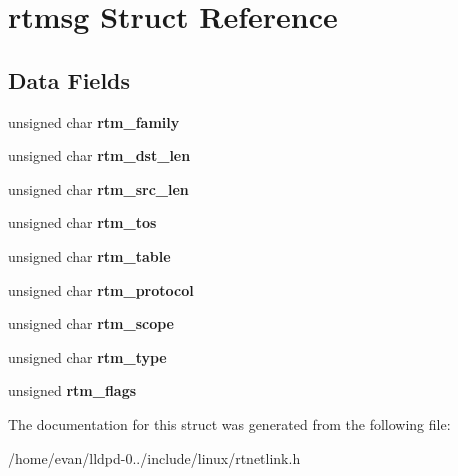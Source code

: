 \section{rtmsg \-Struct \-Reference}
\label{structrtmsg}
\subsection*{\-Data \-Fields}
\begin{DoxyCompactItemize}
\item 
unsigned char {\bfseries rtm\-\_\-family}\label{structrtmsg_ad11d15ca85801239d8d99ba1a2646729}

\item 
unsigned char {\bfseries rtm\-\_\-dst\-\_\-len}\label{structrtmsg_a1e83c05b6e4bbf438dbe786cd382a817}

\item 
unsigned char {\bfseries rtm\-\_\-src\-\_\-len}\label{structrtmsg_a8846977be48d1b01fa3b788c63d41fea}

\item 
unsigned char {\bfseries rtm\-\_\-tos}\label{structrtmsg_a9f225b9d7d31ed95e8d00c12dbc84dd8}

\item 
unsigned char {\bfseries rtm\-\_\-table}\label{structrtmsg_acd1029f3561c19c1b2452c4def27fde0}

\item 
unsigned char {\bfseries rtm\-\_\-protocol}\label{structrtmsg_a2188acbbec78c55d9705cb2d72b0b45e}

\item 
unsigned char {\bfseries rtm\-\_\-scope}\label{structrtmsg_a7dc161f47d108740802f4d8296897d30}

\item 
unsigned char {\bfseries rtm\-\_\-type}\label{structrtmsg_a774c56b2465832b2cfb8f8e8da1fc47b}

\item 
unsigned {\bfseries rtm\-\_\-flags}\label{structrtmsg_aadc8d48552db2fc5ccdcd46e4a6d4c23}

\end{DoxyCompactItemize}


\-The documentation for this struct was generated from the following file\-:\begin{DoxyCompactItemize}
\item 
/home/evan/lldpd-\/0../include/linux/rtnetlink.\-h\end{DoxyCompactItemize}
